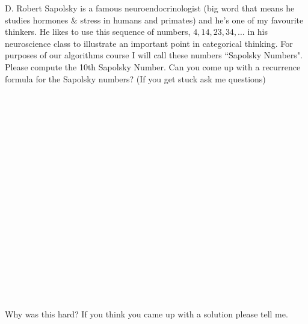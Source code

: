 \documentclass[12pt]{article}
\begin{document}
\noindent D. Robert Sapolsky is a famous neuroendocrinologist (big word that means he studies hormones \& stress in humans and primates) and he's one of my favourite thinkers. He likes to use this sequence of numbers, $4, 14, 23, 34, \dots$ in his neuroscience class to illustrate an important point in categorical thinking. For purposes of our algorithms course I will call these numbers ``Sapolsky Numbers". Please compute the 10th Sapolsky Number. Can you come up with a recurrence formula for the Sapolsky numbers? (If you get stuck ask me questions)\\\\\\\\\\\\\\\\\\\\\\\\\\\\\\\\\\\\\\\\
Why was this hard? If you think you came up with a solution please tell me. 
\end{document}
